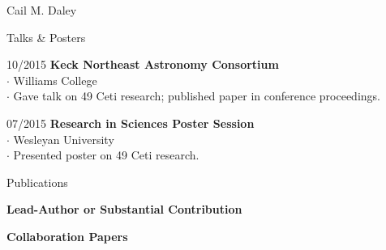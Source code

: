 \documentclass[11pt,a4paper]{article}
\begin{document}
\begin{cv}{Cail M. Daley}
\begin{cvlist}{Talks \& Posters}
  \item[10/2015]
    \textbf{Keck Northeast Astronomy Consortium}\\
    $\cdot$ Williams College\\
    $\cdot$ Gave talk on 49 Ceti research; published paper in conference proceedings.

  \item[07/2015]
    \textbf{Research in Sciences Poster Session}\\
    $\cdot$ Wesleyan University\\
    $\cdot$ Presented poster on 49 Ceti research.

  \end{cvlist}

  \newpage

  \setlength\bibhang{0pt}
  \settowidth{\cvlabelwidth}{1em}%
  \setlength{\cvlabelsep}{0em}

  \begin{cvlist}{Publications}
    \begin{bibunit}
      \nocite{*}
    \item[\textbf{Lead-Author or Substantial Contribution}] \ \\[-1em]
    \end{bibunit}
    \begin{bibunit}
      \nocite{*}
    \item[\textbf{Collaboration Papers}] \ \\[-1em]
    \end{bibunit}
  \end{cvlist}

\end{cv}
\end{document}
